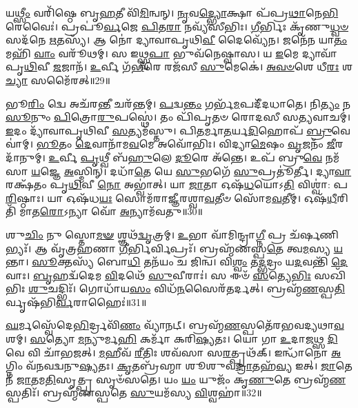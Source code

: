 𑌯\-\ul{𑌥𑍍𑌸𑍀𑌂} 𑌵𑌰𑌿᳴𑌷𑍍𑌠𑍇 𑌬𑍃\-\ul{𑌹}\-𑌤𑍀 𑌵𑌿᳴\-\ul{𑌮𑌿}\-𑌨𑍍𑌵𑌨𑍍।
\-\ul{𑌨𑍃}\-𑌵\-\ul{𑌦𑍍𑌭𑍍𑌯𑍋}\-𑌕𑍍𑌷𑌾 𑌪᳴𑌪𑍍𑌰\-\ul{𑌥𑌾}\-𑌨𑍇\-\ul{𑌭𑌿}\-𑌰𑍇𑌵𑍈𑌃॑।
𑌪𑍍𑌰𑌪𑍂॑\-\ul{𑌰𑍍𑌵}\-𑌜𑍇 \ul{𑌪𑌿}\-𑌤\-\ul{𑌰𑌾} 𑌨𑌵𑍍𑌯᳴𑌸𑍀𑌭𑌿𑌃।
\-\ul{𑌗𑍀}\-𑌰𑍍𑌭𑌿𑌃 𑌕𑍃᳴𑌣𑍁\-\ul{𑌧𑍍𑌵}\-\-\ul{𑍞} 𑌸𑌦᳴𑌨𑍇 \ul{𑌋}\-𑌤𑌸𑍍𑌯᳴।
𑌆 𑌨𑍋॑ 𑌦𑍍𑌯𑌾𑌵𑌾𑌪𑍃𑌥𑌿\-\ul{𑌵𑍀} 𑌦𑍈𑌵𑍍𑌯𑍇᳴𑌨।
𑌜𑌨𑍇᳴𑌨 𑌯𑌾\-\ul{𑌤𑌂} 𑌮𑌹𑌿᳴ \ul{𑌵𑌾𑌂} 𑌵𑌰𑍂᳴𑌥𑌮𑍍।
𑌸 𑌇𑌥𑍍𑌸𑍍𑌵\-\ul{𑌪𑌾} 𑌭𑍁𑌵᳴𑌨𑍇𑌷𑍍𑌵𑌾𑌸।
𑌯 \ul{𑌇}\-𑌮𑍇 𑌦𑍍𑌯𑌾𑌵𑌾᳴𑌪𑍃\-\ul{𑌥𑌿}\-𑌵𑍀 \ul{𑌜}\-𑌜𑌾𑌨᳴।
\-\ul{𑌉}\-𑌰𑍍𑌵𑍀 𑌗᳴\-\ul{𑌭𑍀}\-𑌰𑍇 𑌰𑌜᳴𑌸𑍀 \ul{𑌸𑍁}\-𑌮𑍇𑌕𑍇॑।
\-\ul{𑌅}\-\-\ul{𑌵}\-\-\ul{𑍞}\-𑌶𑍇 𑌧𑍀\-\ul{𑌰𑌃} 𑌶\-\ul{𑌚𑍍𑌯𑌾} 𑌸𑌮𑍈᳴𑌰𑌤𑍍॥29॥

𑌭𑍂\-\ul{𑌰𑌿𑌂} 𑌦𑍍𑌵𑍇 𑌅𑌚᳴𑌰\-\ul{𑌨𑍍𑌤𑍀} 𑌚𑌰᳴𑌨𑍍𑌤𑌮𑍍।
\-\ul{𑌪}\-𑌦𑍍𑌵\-\ul{𑌨𑍍𑌤𑌂} 𑌗𑌰𑍍𑌭᳴\-\ul{𑌮}\-𑌪𑌦𑍀᳴𑌦𑌧𑌾𑌤𑍇।
𑌨𑌿\-\ul{𑌤𑍍𑌯𑌂} 𑌨 \ul{𑌸𑍂}\-𑌨𑍁𑌂 \ul{𑌪𑌿}\-𑌤𑍍𑌰𑍋\-\ul{𑌰𑍁}\-𑌪𑌸𑍍𑌥𑍇॑।
𑌤𑌂 𑌪𑌿᳴𑌪𑍃𑌤𑍞 𑌰𑍋𑌦𑌸𑍀 𑌸\-\ul{𑌤𑍍𑌯}\-𑌵𑌾𑌚𑌮𑍍॑।
\-\ul{𑌇}\-𑌦𑌂 𑌦𑍍𑌯𑌾᳴𑌵𑌾𑌪𑍃𑌥𑌿𑌵𑍀 \ul{𑌸}\-𑌤𑍍𑌯𑌮᳴𑌸𑍍𑌤𑍁।
𑌪𑌿\-\ul{𑌤}\-𑌰𑍍𑌮𑌾\-\ul{𑌤}\-𑌰𑍍𑌯\-\ul{𑌦𑌿}\-𑌹𑍋𑌪᳴ \ul{𑌬𑍍𑌰𑍁}\-𑌵𑍇 𑌵𑌾॑𑌮𑍍।
\-\ul{𑌭𑍂}\-𑌤𑌂 \ul{𑌦𑍇}\-𑌵𑌾𑌨𑌾᳴𑌮\-\ul{𑌵}\-𑌮𑍇 𑌅𑌵𑍋᳴𑌭𑌿𑌃।
𑌵𑌿𑌦𑍍𑌯𑌾\-\ul{𑌮𑍇}\-𑌷𑌂 \ul{𑌵𑍃}\-𑌜𑌨𑌂᳴ \ul{𑌜𑍀}\-𑌰𑌦𑌾᳴𑌨𑍁𑌮𑍍।
\-\ul{𑌉}\-𑌰𑍍𑌵𑍀 \ul{𑌪𑍃}\-𑌥𑍍𑌵𑍀 𑌬᳴\-\ul{𑌹𑍁}\-𑌲𑍇 \ul{𑌦𑍂}\-𑌰𑍇 𑌅᳴𑌨𑍍𑌤𑍇।
𑌉𑌪᳴ 𑌬𑍍𑌰𑍁\-\ul{𑌵𑍇} 𑌨𑌮᳴𑌸𑌾 \ul{𑌯}\-𑌜𑍍𑌞𑍇 \ul{𑌅}\-𑌸𑍍𑌮𑌿𑌨𑍍।
𑌦𑌧𑌾᳴\-\ul{𑌤𑍇} 𑌯𑍇 \ul{𑌸𑍁}\-𑌭𑌗𑍇᳴ \ul{𑌸𑍁}\-𑌪𑍍𑌰𑌤𑍂॑𑌰𑍍𑌤𑍀।
𑌦𑍍𑌯𑌾\-\ul{𑌵𑌾} 𑌰𑌕𑍍𑌷᳴𑌤𑌂 𑌪𑍃\-\ul{𑌥𑌿}\-𑌵𑍀 \ul{𑌨𑍋} 𑌅𑌭𑍍𑌵𑌾॑𑌤𑍍।
𑌯𑌾 \ul{𑌜𑌾}\-𑌤𑌾 𑌓𑌷᳴\-\ul{𑌧}\-𑌯𑍋𑌽\-\ul{𑌤𑌿} 𑌵𑌿𑌶𑍍𑌵𑌾॑: 𑌪\-\ul{𑌰𑌿}\-𑌷𑍍𑌠𑌾𑌃।
𑌯𑌾 𑌓𑌷᳴𑌧\-\ul{𑌯𑌃} 𑌸𑍋𑌮᳴𑌰𑌾𑌜𑍍𑌞𑍀𑌰𑌶𑍍𑌵𑌾\-\ul{𑌵}\-𑌤𑍀𑍞 𑌸𑍋᳴𑌮\-\ul{𑌵}\-𑌤𑍀𑌮𑍍।
𑌓𑌷᳴\-\ul{𑌧𑍀}\-𑌰𑌿𑌤𑌿᳴ 𑌮𑌾𑌤\-\ul{𑌰𑍋}\-\-𑌽𑌨𑍍𑌯𑌾 𑌵𑍋᳴ \ul{𑌅}\-𑌨𑍍𑌯𑌾𑌮᳴𑌵𑌤𑍁॥30॥\anuvakamend[\-\ul{𑌹}\-𑌵𑌿𑌰𑍍𑌨𑍋᳴ 𑌦𑌾𑌦𑍍𑌭𑌭𑍂𑌵 \ul{𑌰𑌾}\-𑌤𑌿𑌂 \ul{𑌪𑍂}\-𑌰𑍍𑌵𑌹𑍂᳴𑌤𑌾\-\ul{𑌵}\-𑌰𑍍𑌕𑍈𑌰𑍈᳴𑌰\-\ul{𑌦}\-𑌸𑍍𑌮𑌿𑌨𑍍𑌪𑌞𑍍𑌚᳴ 𑌚]

𑌶𑍁\-\ul{𑌚𑌿𑌂} 𑌨𑍁 𑌸𑍍𑌤𑍋\-\ul{𑌮}\-\-\ul{𑍟} 𑌶𑍍𑌞𑌥᳴\-\ul{𑌦𑍍𑌵𑍃}\-𑌤𑍍𑌰𑌮𑍍।
\-\ul{𑌉}\-𑌭𑌾 𑌵𑌾᳴𑌮𑌿𑌨𑍍𑌦𑍍𑌰𑌾\-\ul{𑌗𑍍𑌨𑍀} 𑌪𑍍𑌰 𑌚᳴𑌰𑍍\mbox{}\-\ul{𑌷}\-𑌣𑌿𑌭𑍍𑌯𑌃᳴।
𑌆 𑌵𑍃᳴𑌤𑍍𑌰𑌹𑌣𑌾 \ul{𑌗𑍀}\-𑌰𑍍𑌭𑌿𑌰𑍍𑌵𑌿𑌪𑍍𑌰𑌃᳴।
𑌬𑍍𑌰𑌹𑍍𑌮᳴𑌣𑌸𑍍𑌪\-\ul{𑌤𑍇} 𑌤𑍍𑌵\-\ul{𑌮}\-𑌸𑍍𑌯 \ul{𑌯}\-𑌨𑍍𑌤𑌾।
\-\ul{𑌸𑍂}\-𑌕𑍍𑌤𑌸𑍍𑌯᳴ 𑌬𑍋\-\ul{𑌧𑌿} 𑌤𑌨᳴𑌯𑌂 𑌚 𑌜𑌿𑌨𑍍𑌵।
𑌵𑌿\-\ul{𑌶𑍍𑌵𑌂} 𑌤\-\ul{𑌦𑍍𑌭}\-𑌦𑍍𑌰𑌂 𑌯\-\ul{𑌦}\-𑌵𑌨𑍍𑌤𑌿᳴ \ul{𑌦𑍇}\-𑌵𑌾𑌃।
\-\ul{𑌬𑍃}\-𑌹𑌦𑍍𑌵᳴𑌦𑍇𑌮 \ul{𑌵𑌿}\-𑌦𑌥𑍇᳴ \ul{𑌸𑍁}\-𑌵𑍀𑌰𑌾𑌃॑।
𑌸 𑌈𑍞᳴ \ul{𑌸}\-𑌤𑍍𑌯𑍇\-\ul{𑌭𑌿𑌃} 𑌸𑌖𑌿᳴𑌭𑌿𑌃 \ul{𑌶𑍁}\-𑌚𑌦𑍍𑌭𑌿𑌃᳴।
𑌗𑍋𑌧𑌾᳴𑌯\-\ul{𑌸𑌂} 𑌵𑌿𑌧᳴\-\ul{𑌨}\-𑌸𑍈𑌰᳴𑌤𑌰𑍍𑌦𑌤𑍍।
𑌬𑍍𑌰𑌹𑍍𑌮᳴\-\ul{𑌣}\-𑌸𑍍𑌪\-\ul{𑌤𑌿}\-𑌰𑍍𑌵𑍃𑌷᳴𑌭𑌿\-\ul{𑌰𑍍𑌵}\-𑌰𑌾𑌹𑍈𑌃॑॥31॥

\-\ul{𑌘}\-𑌰𑍍𑌮𑌸𑍍𑌵𑍇᳴𑌦𑍇\-\ul{𑌭𑌿}\-𑌰𑍍𑌦𑍍𑌰𑌵𑌿᳴\-\ul{𑌣𑌂} 𑌵𑍍𑌯𑌾᳴𑌨𑌟𑍍।
𑌬𑍍𑌰𑌹𑍍𑌮᳴\-\ul{𑌣}\-𑌸𑍍𑌪𑌤𑍇᳴𑌰𑌭𑌵𑌦𑍍𑌯𑌥𑌾\-\ul{𑌵}\-𑌶𑌮𑍍।
\-\ul{𑌸}\-𑌤𑍍𑌯𑍋 \ul{𑌮}\-𑌨𑍍𑌯𑍁𑌰𑍍𑌮\-\ul{𑌹𑌿} 𑌕𑌰𑍍𑌮𑌾᳴ 𑌕𑌰𑌿\-\ul{𑌷𑍍𑌯}\-𑌤𑌃।
𑌯𑍋 𑌗𑌾 \ul{𑌉}\-𑌦𑌾\-\ul{𑌜}\-𑌥𑍍𑌸 \ul{𑌦𑌿}\-𑌵𑍇 𑌵𑌿 𑌚𑌾᳴𑌭𑌜𑌤𑍍।
\-\ul{𑌮}\-𑌹𑍀𑌵᳴ \ul{𑌰𑍀}\-𑌤𑌿𑌃 𑌶𑌵᳴𑌸𑌾 𑌸\-\ul{𑌰}\-𑌤𑍍𑌪𑍃𑌥᳴𑌕𑍍।
𑌇𑌨𑍍𑌧𑌾᳴𑌨𑍋 \ul{𑌅}\-𑌗𑍍𑌨𑌿𑌂 𑌵᳴𑌨𑌵𑌦𑍍𑌵𑌨𑍁\-\ul{𑌷𑍍𑌯}\-𑌤𑌃।
\-\ul{𑌕𑍃}\-𑌤𑌬𑍍𑌰᳴𑌹𑍍𑌮𑌾 𑌶𑍂𑌶𑍁𑌵\-\ul{𑌦𑍍𑌰𑌾}\-𑌤𑌹᳴\-\ul{𑌵𑍍𑌯} 𑌇𑌤𑍍।
\-\ul{𑌜𑌾}\-𑌤𑍇𑌨᳴ \ul{𑌜𑌾}\-𑌤𑌮\-\ul{𑌤𑌿}\-𑌸𑍃𑌤𑍍𑌪𑍍𑌰 𑌸𑍃𑍞᳴𑌸𑌤𑍇।
𑌯𑌂 \ul{𑌯𑌂} 𑌯𑍁𑌜𑌂᳴ 𑌕𑍃\-\ul{𑌣𑍁}\-𑌤𑍇 𑌬𑍍𑌰𑌹𑍍𑌮᳴\-\ul{𑌣}\-𑌸𑍍𑌪𑌤𑌿𑌃᳴।
𑌬𑍍𑌰𑌹𑍍𑌮᳴𑌣𑌸𑍍𑌪𑌤𑍇 \ul{𑌸𑍁}\-𑌯𑌮᳴𑌸𑍍𑌯 \ul{𑌵𑌿}\-𑌶𑍍𑌵𑌹𑌾॑॥32॥

